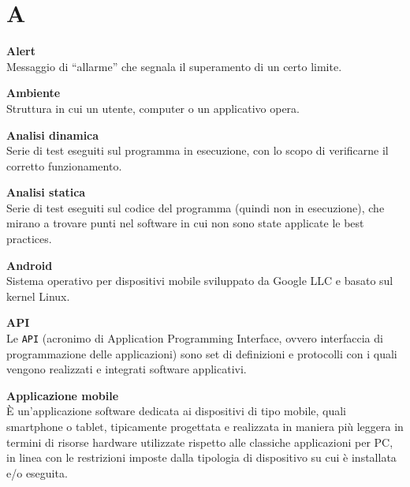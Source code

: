 \documentclass[a4paper, oneside, openany, dvipsnames, table, 12pt]{article}
\begin{document}
\copertina{}

\renewcommand{\arraystretch}{1.5}



\newpage
\tableofcontents
\newpage

\newpage
\section{A}  
\label{par:alert}
\textbf{Alert} \\
Messaggio di “allarme” che segnala il superamento di un certo limite.

\textbf{Ambiente} \\
Struttura in cui un utente, computer o un applicativo opera.

\textbf{Analisi dinamica} \\
Serie di test eseguiti sul programma in esecuzione, con lo scopo di verificarne il corretto funzionamento.  

\textbf{Analisi statica} \\
Serie di test eseguiti sul codice del programma (quindi non in esecuzione), che mirano a trovare punti nel software in cui non sono state applicate le best practices\glo.

\textbf{Android} \\
Sistema operativo per dispositivi mobile sviluppato da Google LLC e basato sul kernel Linux.

\textbf{API} \\
Le \texttt{API} (acronimo di Application Programming Interface, ovvero interfaccia di programmazione delle applicazioni) sono set di definizioni e protocolli con i quali vengono realizzati e integrati software applicativi. 

\textbf{Applicazione mobile} \\
È un'applicazione software dedicata ai dispositivi di tipo mobile, quali smartphone o tablet, tipicamente progettata e realizzata in maniera più leggera in termini di risorse hardware utilizzate rispetto alle classiche applicazioni per PC, in linea con le restrizioni imposte dalla tipologia di dispositivo su cui è installata e/o eseguita. 
\end{document}
